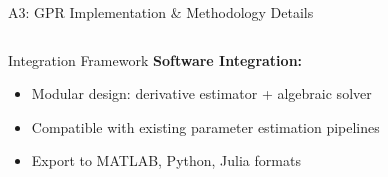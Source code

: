 \documentclass[aspectratio=169]{beamer}
\begin{document}
\begin{frame}{A3: GPR Implementation \& Methodology Details}
\begin{columns}[t]
\begin{column}{0.48\textwidth}
\begin{block}{\small Integration Framework}
        \textbf{Software Integration:}
        \begin{itemize}
          \item Modular design: derivative estimator + algebraic solver
          \item Compatible with existing parameter estimation pipelines
          \item Export to MATLAB, Python, Julia formats
        \end{itemize}
      \end{block}
      
      \vspace{0.5em}
      \begin{center}
      \end{center}
    \end{column}
  \end{columns}
  
\end{frame}
\end{document}
